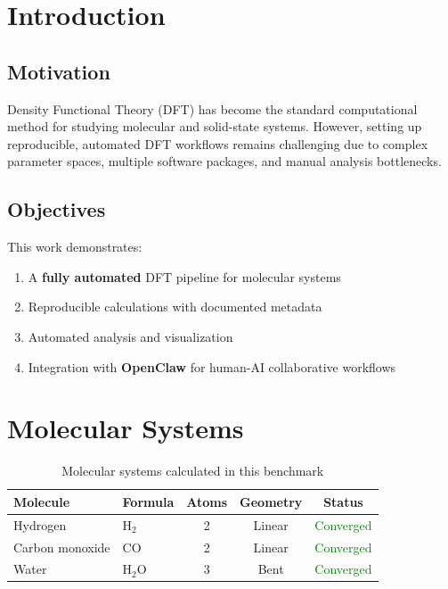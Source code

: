 \documentclass[11pt,a4paper]{article}
\begin{document}
\newpage
\tableofcontents
\newpage

\section{Introduction}

\subsection{Motivation}

Density Functional Theory (DFT) has become the standard computational method for studying molecular and solid-state systems. However, setting up reproducible, automated DFT workflows remains challenging due to complex parameter spaces, multiple software packages, and manual analysis bottlenecks.

\subsection{Objectives}

This work demonstrates:
\begin{enumerate}
    \item A \textbf{fully automated} DFT pipeline for molecular systems
    \item Reproducible calculations with documented metadata
    \item Automated analysis and visualization
    \item Integration with \textbf{OpenClaw} for human-AI collaborative workflows
\end{enumerate}

\section{Molecular Systems}

\begin{table}[h]
\centering
\begin{tabular}{llccc}
\toprule
\textbf{Molecule} & \textbf{Formula} & \textbf{Atoms} & \textbf{Geometry} & \textbf{Status} \\
\midrule
Hydrogen & H$_2$ & 2 & Linear & \textcolor{green}{Converged} \\
Carbon monoxide & CO & 2 & Linear & \textcolor{green}{Converged} \\
Water & H$_2$O & 3 & Bent & \textcolor{green}{Converged} \\
\bottomrule
\end{tabular}
\caption{Molecular systems calculated in this benchmark}
\end{table}
\end{document}
